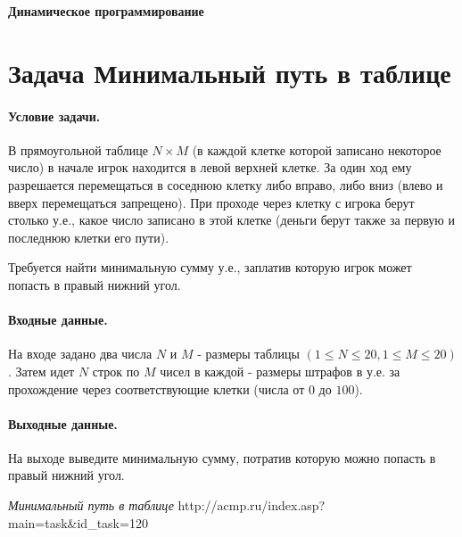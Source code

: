 \documentclass[12pt, twoside]{article}
\begin{document}
 

\begin{center}
{\LARGE\bf
Динамическое программирование
}
\end{center}

\section{Задача Минимальный путь в таблице\cite{Minpath}}

\paragraph{Условие задачи.} В прямоугольной таблице $N\times M$ (в каждой клетке которой записано некоторое число) в начале игрок находится в левой верхней клетке. За один ход ему разрешается перемещаться в соседнюю клетку либо вправо, либо вниз (влево и вверх перемещаться запрещено). При проходе через клетку с игрока берут столько у.е., какое число записано в этой клетке (деньги берут также за первую и последнюю клетки его пути).

Требуется найти минимальную сумму у.е., заплатив которую игрок может попасть в правый нижний угол.
\paragraph{Входные данные.} На входе задано два числа $N$ и $M$ - размеры таблицы $(1 \leq N \leq 20, 1 \leq M \leq 20)$. Затем идет $N$ строк по $M$ чисел в каждой - размеры штрафов в у.е. за прохождение через соответствующие клетки (числа от $0$ до $100$).
\paragraph{Выходные данные.} На выходе выведите минимальную сумму, потратив которую можно попасть в правый нижний угол.
\begin{thebibliography}{99}
	\textit{Минимальный путь в таблице} {http://acmp.ru/index.asp?main=task\&id\_task=120}
\end{thebibliography}
\end{document}
